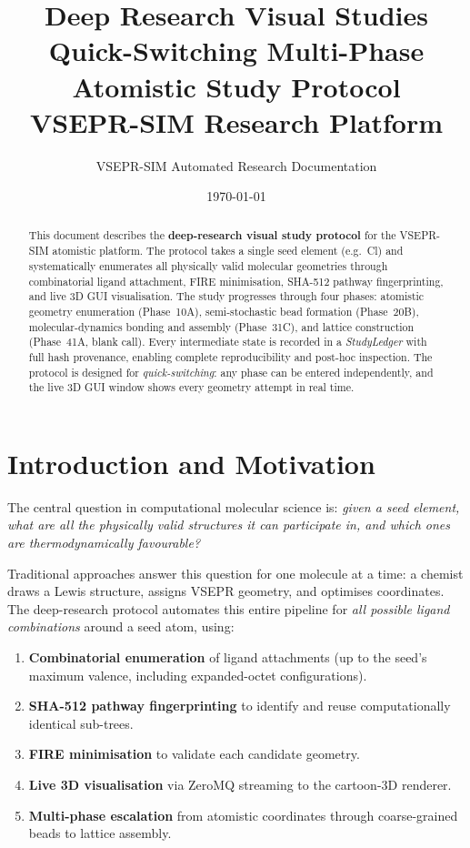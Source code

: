 \documentclass[11pt,a4paper]{article}
\title{%
  \vspace{-1cm}
  \textbf{Deep Research Visual Studies}\\[0.3cm]
  \large Quick-Switching Multi-Phase Atomistic Study Protocol\\[0.2cm]
  \normalsize VSEPR-SIM Research Platform
}
\author{VSEPR-SIM Automated Research Documentation}
\date{\today}
\begin{document}
\maketitle
\thispagestyle{fancy}

\begin{abstract}
This document describes the \textbf{deep-research visual study protocol}
for the VSEPR-SIM atomistic platform.  The protocol takes a single seed
element (e.g.\ Cl) and systematically enumerates all physically valid
molecular geometries through combinatorial ligand attachment, FIRE
minimisation, SHA-512 pathway fingerprinting, and live 3D GUI
visualisation.  The study progresses through four phases:
atomistic geometry enumeration (Phase~10A), semi-stochastic bead
formation (Phase~20B), molecular-dynamics bonding and assembly
(Phase~31C), and lattice construction (Phase~41A, blank call).
Every intermediate state is recorded in a \emph{StudyLedger} with full
hash provenance, enabling complete reproducibility and post-hoc
inspection.  The protocol is designed for \emph{quick-switching}:
any phase can be entered independently, and the live 3D GUI window
shows every geometry attempt in real time.
\end{abstract}

\tableofcontents
\newpage

\section{Introduction and Motivation}
\label{sec:intro}

The central question in computational molecular science is:
\emph{given a seed element, what are all the physically valid structures
it can participate in, and which ones are thermodynamically favourable?}

Traditional approaches answer this question for one molecule at a time:
a chemist draws a Lewis structure, assigns VSEPR geometry, and optimises
coordinates.  The deep-research protocol automates this entire pipeline
for \emph{all possible ligand combinations} around a seed atom, using:

\begin{enumerate}
  \item \textbf{Combinatorial enumeration} of ligand attachments
        (up to the seed's maximum valence, including expanded-octet
        configurations).
  \item \textbf{SHA-512 pathway fingerprinting} to identify and reuse
        computationally identical sub-trees.
  \item \textbf{FIRE minimisation} to validate each candidate geometry.
  \item \textbf{Live 3D visualisation} via ZeroMQ streaming to the
        cartoon-3D renderer.
  \item \textbf{Multi-phase escalation} from atomistic coordinates
        through coarse-grained beads to lattice assembly.
\end{enumerate}
\end{document}
